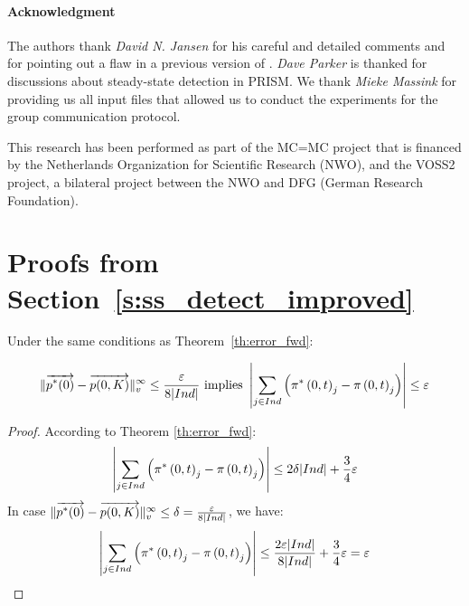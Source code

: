 \documentclass{entcs}
\newcommand{\Section}[1]{\section{#1}}
\begin{document}
	{\small \paragraph{Acknowledgment}
	The authors thank \emph{David N. Jansen} for his careful and detailed comments and for pointing out a flaw in a previous version of \cite{KatoenZ_QEST06}. \emph{Dave Parker} is thanked for discussions about steady-state detection in PRISM. We thank \emph{Mieke Massink} for providing us all input files that allowed us to conduct the experiments for the group communication protocol.

	This research has been performed as part of the MC=MC project that is financed by the Netherlands Organization for Scientific Research (NWO), and the VOSS2 project, a bilateral project between the NWO and DFG (German Research Foundation).}

{\footnotesize
	
}

	\appendix
	\appendixpage

	\Section{ Proofs from Section~\ref{s:ss_detect_improved} \label{app:ss_detect_improved}}

		\begin{corollary}
			Under the same conditions as Theorem~\ref{th:error_fwd}:
			\begin{fframe}{0.9}{-0.2}
				\begin{equation}
					\lVert  \overrightarrow{p^{*}(0)} - \overrightarrow{p(0,K)}  \rVert_{v}^{\infty} \leq \frac{\varepsilon}{8 |Ind|} \text{ implies } \left| \sum_{j \in Ind} \left( \pi^{*} \left(0, t \right )_{j} - \pi \left(0, t \right )_{j} \right) \right| \leq \varepsilon \nonumber
				\end{equation}
			\end{fframe}
		\end{corollary}
		{\small
			\begin{proof}
				According to Theorem \ref{th:error_fwd}:
				\begin{equation}
					\left| \sum_{j \in Ind} \left( \pi^{*} \left(0, t \right )_{j} - \pi \left(0, t \right )_{j} \right) \right| \leq 2 \delta |Ind| + \frac{3}{4} \varepsilon \nonumber
				\end{equation}
				In case $\lVert  \overrightarrow{p^{*}(0)} - \overrightarrow{p(0,K)}  \rVert_{v}^{\infty} \leq \delta = \frac{\varepsilon}{8 |Ind|}$, we have:
				\begin{equation}
					\left| \sum_{j \in Ind} \left( \pi^{*} \left(0, t \right )_{j} - \pi \left(0, t \right )_{j} \right) \right| \leq \frac{2 \varepsilon |Ind|}{8 |Ind|}  + \frac{3}{4} \varepsilon = \varepsilon \nonumber
				\end{equation}
			\end{proof}
		}
\end{document}
